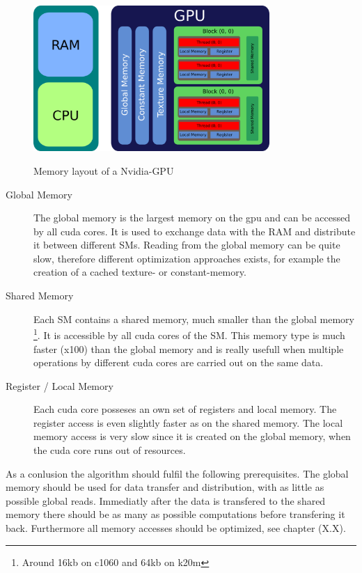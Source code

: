 \begin{figure}[!bp]
  \centering
  \includegraphics[width=0.8\textwidth]{gfx/cuda/gpu.png}\label{fig:gpu_arch}
  \caption{Memory layout of a Nvidia-GPU}
\end{figure}

\begin{description}
    \item[Global Memory] The global memory is the largest memory on the gpu and can be accessed by all cuda cores.
                         It is  used to exchange data with the RAM and distribute it between different SMs.
                         Reading from the global memory can be quite slow, therefore different optimization approaches exists,
                         for example the creation of a cached texture- or constant-memory.

    \item[Shared Memory] Each SM contains a shared memory, much smaller than the global memory \footnote{Around 16kb on c1060 and 64kb on k20m}. It is accessible
                         by all cuda cores of the SM.
                         This memory type is much faster (x100) than the global memory and is really usefull when multiple operations
                         by different cuda cores are carried out on the same data.
                         \newpage

    \item[Register / Local Memory] Each cuda core posseses an own set of registers and local memory.
                                   The register access is even slightly faster as on the shared memory. The local memory access is very slow since
                                   it is created on the global memory, when the cuda core runs out of resources.
\end{description}

As a conlusion the algorithm should fulfil the following prerequisites.
The global memory should be used for data transfer and distribution, with as little as possible global reads.
Immediatly after the data is transfered to the shared memory there should be as many as possible computations before transfering
it back. Furthermore all memory accesses should be optimized, see chapter (X.X).

